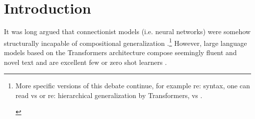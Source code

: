\documentclass[11pt]{article}
\begin{document}
\begin{abstract}
\end{abstract}

\section{Introduction}
It was long argued that connectionist models (i.e. neural networks) were somehow structurally incapable of compositional generalization \cite{FodorPylyshyn1988}.\footnote{\begin{footnotesize}
More specific versions of this debate continue, for example re: syntax, one can read \cite{vanschijndel2019quantitydoesntbuyquality} vs \cite{goldberg2019assessingbertssyntacticabilities} or re: hierarchical generalization by Transformers, \cite{petty2021transformersgeneralizelinearly} vs \cite{murty2023grokkinghierarchicalstructurevanilla}.
\end{footnotesize}
} 
However, large language models based on the Transformers architecture compose seemingly fluent and novel text and are excellent few or zero shot learners \cite{Brown2020}.
\end{document}
